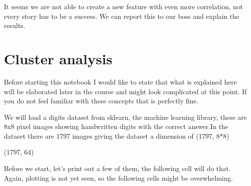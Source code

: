 \documentclass[letterpaper,10pt,english]{jupyterBook}
\begin{document}
\noindent{}

\sphinxAtStartPar
It seems we are not able to create a new feature with even more correlation, not every story has to be a success. We can report this to our boss and explain the results.


\chapter{Cluster analysis}
\label{\detokenize{c5_data_exploration/cluster_analysis:cluster-analysis}}\label{\detokenize{c5_data_exploration/cluster_analysis::doc}}
\sphinxAtStartPar
Before starting this notebook I would like to state that what is explained here will be elaborated later in the course and might look complicated at this point. If you do not feel familiar with these concepts that is perfectly fine.

\begin{sphinxVerbatim}[commandchars=\\\{\}]
   
   
\end{sphinxVerbatim}

\sphinxAtStartPar
We will load a digits dataset from sklearn, the machine learning library, these are 8x8 pixel images showing handwritten digits with the correct answer.In the dataset there are 1797 images giving the dataset a dimension of (1797, 8*8)

\begin{sphinxVerbatim}[commandchars=\\\{\}]
   
  
\end{sphinxVerbatim}

\begin{sphinxVerbatim}[commandchars=\\\{\}]
(1797, 64)
\end{sphinxVerbatim}

\sphinxAtStartPar
Before we start, let’s print out a few of them, the following cell will do that.
Again, plotting is not yet seen, so the following cells might be overwhelming.
\end{document}
